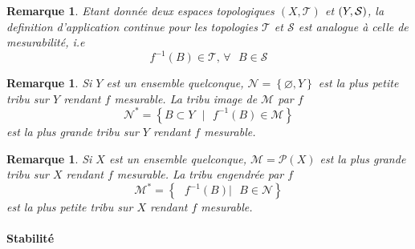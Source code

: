 \documentclass[3pt]{article}
\newtheorem{remark}[theorem]{Remarque}
\begin{document}
\bigskip

\begin{remark}
Etant donn\'{e}e deux espaces topologiques $(X,\mathcal{T})$ et $(Y,\mathcal{%
S})$, la definition d'application continue pour les topologies $\mathcal{T}$
et $\mathcal{S}$ est analogue \`{a} celle de mesurabilit\'{e}, i.e%
\begin{equation*}
f^{-1}(B)\in \mathcal{T}\text{, }\forall \text{ }B\in \mathcal{S}
\end{equation*}
\end{remark}

\bigskip

\begin{remark}
Si $Y$ est un ensemble quelconque, $\mathcal{N=}\left\{ \varnothing
,Y\right\} $ est la plus petite tribu sur $Y$ rendant $f$ mesurable. La
tribu image de $\mathcal{M}$ par $f\ $%
\begin{equation*}
\mathcal{N}^{\ast }\mathcal{=}\left\{ B\subset Y\text{ }|\text{ }%
f^{-1}(B)\in \mathcal{M}\right\}
\end{equation*}%
est la plus grande tribu sur $Y$ rendant $f$ mesurable.
\end{remark}

\bigskip

\begin{remark}
Si $X$ est un ensemble quelconque, $\mathcal{M=P}(X)$ est la plus grande
tribu sur $X$ rendant $f$ mesurable. La tribu engendr\'{e}e par $f\ $%
\begin{equation*}
\mathcal{M}^{\ast }\mathcal{=}\left\{ \text{ }f^{-1}(B)|\text{ }B\in 
\mathcal{N}\right\}
\end{equation*}%
est la plus petite tribu sur $X$ rendant $f$ mesurable.
\end{remark}

\paragraph{Stabilit\'{e}}

\bigskip
\end{document}
